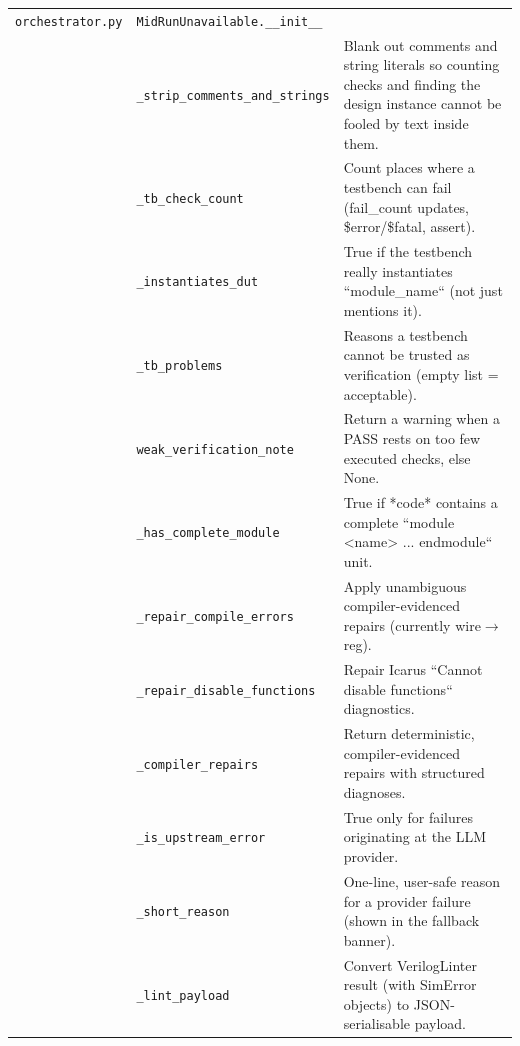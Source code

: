 \begin{longtable}{@{}p{2.8cm}>{\raggedright\arraybackslash}p{4.6cm}p{7.9cm}@{}}
{\small \nolinkurl{orchestrator.py}} & \texttt{\small MidRunUnavailable.\allowbreak \_\allowbreak{}\_\allowbreak{}init\_\allowbreak{}\_\allowbreak{}} &  \\
{\small } & \texttt{\small \_\allowbreak{}strip\_\allowbreak{}comments\_\allowbreak{}and\_\allowbreak{}strings} & Blank out comments and string literals so counting checks and finding the design instance cannot be fooled by text inside them. \\
{\small } & \texttt{\small \_\allowbreak{}tb\_\allowbreak{}check\_\allowbreak{}count} & Count places where a testbench can fail (fail\_count updates, \$error/\$fatal, assert). \\
{\small } & \texttt{\small \_\allowbreak{}instantiates\_\allowbreak{}dut} & True if the testbench really instantiates ``module\_name`` (not just mentions it). \\
{\small } & \texttt{\small \_\allowbreak{}tb\_\allowbreak{}problems} & Reasons a testbench cannot be trusted as verification (empty list = acceptable). \\
{\small } & \texttt{\small weak\_\allowbreak{}verification\_\allowbreak{}note} & Return a warning when a PASS rests on too few executed checks, else None. \\
{\small } & \texttt{\small \_\allowbreak{}has\_\allowbreak{}complete\_\allowbreak{}module} & True if *code* contains a complete ``module \textless{}name\textgreater{} ... endmodule`` unit. \\
{\small } & \texttt{\small \_\allowbreak{}repair\_\allowbreak{}compile\_\allowbreak{}errors} & Apply unambiguous compiler-evidenced repairs (currently wire$\rightarrow$reg). \\
{\small } & \texttt{\small \_\allowbreak{}repair\_\allowbreak{}disable\_\allowbreak{}functions} & Repair Icarus ``Cannot disable functions`` diagnostics. \\
{\small } & \texttt{\small \_\allowbreak{}compiler\_\allowbreak{}repairs} & Return deterministic, compiler-evidenced repairs with structured diagnoses. \\
{\small } & \texttt{\small \_\allowbreak{}is\_\allowbreak{}upstream\_\allowbreak{}error} & True only for failures originating at the LLM provider. \\
{\small } & \texttt{\small \_\allowbreak{}short\_\allowbreak{}reason} & One-line, user-safe reason for a provider failure (shown in the fallback banner). \\
{\small } & \texttt{\small \_\allowbreak{}lint\_\allowbreak{}payload} & Convert VerilogLinter result (with SimError objects) to JSON-serialisable payload. \\

\end{longtable}
